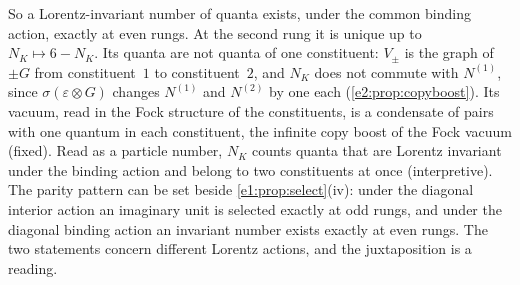 So a Lorentz-invariant number of quanta exists, under the common binding action, exactly at even rungs. At the second rung it is unique up
to $N_K\mapsto6-N_K$. Its quanta are not quanta of one constituent: $V_\pm$ is the graph of $\pm G$ from constituent~$1$ to constituent~$2$, and
$N_K$ does not commute with $N^{(1)}$, since $\sigma(\varepsilon\otimes G)$ changes $N^{(1)}$ and $N^{(2)}$ by one each (\cref{e2:prop:copyboost}). Its
vacuum, read in the Fock structure of the constituents, is a condensate of pairs with one quantum in each constituent, the infinite
copy boost of the Fock vacuum (fixed). Read as a particle number, $N_K$ counts quanta that are Lorentz invariant under the binding action
and belong to two constituents at once (interpretive). The parity pattern can be set beside \cref{e1:prop:select}(iv): under the diagonal
interior action an imaginary unit is selected exactly at odd rungs, and under the diagonal binding action an invariant number exists
exactly at even rungs. The two statements concern different Lorentz actions, and the juxtaposition is a reading.


